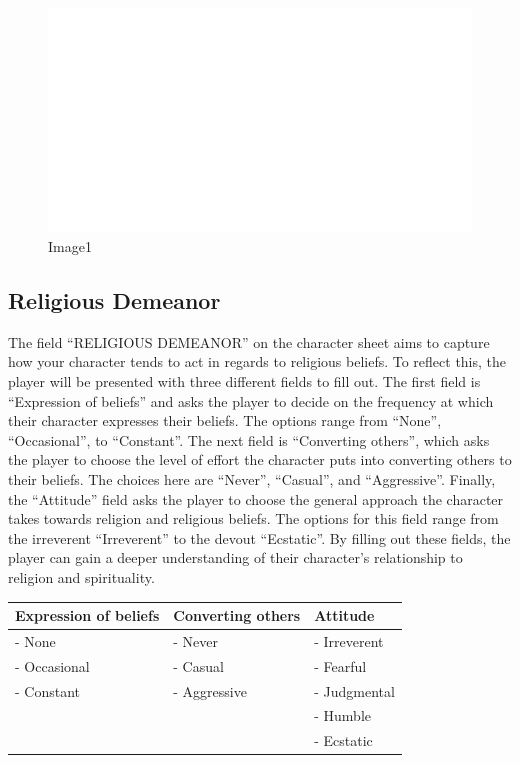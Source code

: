 \begin{figure}
\centering
\includegraphics{./images/religion03.svg}
\caption{Image1}
\end{figure}

\hypertarget{religious-demeanor}{%
\subsection{Religious Demeanor}\label{religious-demeanor}}

The field ``RELIGIOUS DEMEANOR'' on the character sheet aims to capture
how your character tends to act in regards to religious beliefs. To
reflect this, the player will be presented with three different fields
to fill out. The first field is ``Expression of beliefs'' and asks the
player to decide on the frequency at which their character expresses
their beliefs. The options range from ``None'', ``Occasional'', to
``Constant''. The next field is ``Converting others'', which asks the
player to choose the level of effort the character puts into converting
others to their beliefs. The choices here are ``Never'', ``Casual'', and
``Aggressive''. Finally, the ``Attitude'' field asks the player to
choose the general approach the character takes towards religion and
religious beliefs. The options for this field range from the irreverent
``Irreverent'' to the devout ``Ecstatic''. By filling out these fields,
the player can gain a deeper understanding of their character's
relationship to religion and spirituality.

\begin{longtable}[]{@{}lll@{}}
\toprule
Expression of beliefs & Converting others & Attitude \\
\midrule
\endhead
- None & - Never & - Irreverent \\
- Occasional & - Casual & - Fearful \\
- Constant & - Aggressive & - Judgmental \\
& & - Humble \\
& & - Ecstatic \\
\bottomrule
\end{longtable}

